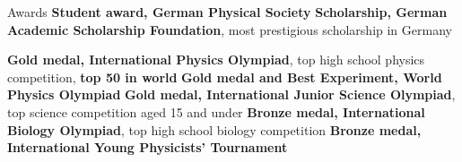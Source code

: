 \begin{rubric}{Awards}
\entry*[2012\hfill] \textbf{Student award, German Physical Society}
\entry*[2009\hfill] \textbf{Scholarship, German Academic Scholarship Foundation}, most prestigious scholarship in Germany

\entry*[2009      ] \textbf{Gold medal, International Physics Olympiad}, top high school physics competition, \textbf{top 50 in world}
\entry*[2011\hfill] \textbf{Gold medal and Best Experiment, World Physics Olympiad}
\entry*[2007-2008\hfill] \textbf{Gold medal, International Junior Science Olympiad}, top science competition aged 15 and under
\entry*[2010\hfill] \textbf{Bronze medal, International Biology Olympiad}, top high school biology competition
\entry*[2009\hfill] \textbf{Bronze medal, International Young Physicists' Tournament}

\end{rubric}
